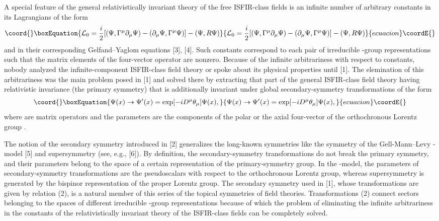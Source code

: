 \documentclass[a4paper,12pt]{article}
\begin{document}
A special feature of the general relativistically invariant theory of the free
ISFIR-class fields is an infinite number of arbitrary constants in its
Lagrangians of the form
\begin{equation}\coord{}\boxEquation{
{\cal L}_{0} = \frac{i}{2}[(\Psi, \Gamma^{\mu} \partial_{\mu} \Psi ) - 
(\partial_{\mu} \Psi, \Gamma^{\mu} \Psi )] - (\Psi, R\Psi )
}{
{\cal L}_{0} = \frac{i}{2}[(\Psi, \Gamma^{\mu} \partial_{\mu} \Psi ) - 
(\partial_{\mu} \Psi, \Gamma^{\mu} \Psi )] - (\Psi, R\Psi )
}{ecuacion}\coordE{}\end{equation}
and in their corresponding Gelfand--Yaglom equations [3], [4]. Such constants
correspond to each pair of irreducible \coordHE{}-group representations
such that the matrix elements of the four-vector operator \myHighlight{$\Gamma^{\mu}$}\coordHE{} are
nonzero. Because of the infinite arbitrariness with respect to constants,
nobody analyzed the infinite-component ISFIR-class field theory or spoke about
its physical properties until [1]. The elemination of this arbitrariness was 
the main problem posed in [1] and solved there by extracting that part of the
general ISFIR-class field theory having relativistic invariance (the primary
symmetry) that is additionally invariant under global secondary-symmetry
transformations of the form
\begin{equation}\coord{}\boxEquation{
\Psi (x) \rightarrow \Psi '(x) = \exp [-i D^{\mu} \theta_{\mu}] \Psi (x),
}{
\Psi (x) \rightarrow \Psi '(x) = \exp [-i D^{\mu} \theta_{\mu}] \Psi (x),
}{ecuacion}\coordE{}\end{equation}
where \coordHE{} are matrix operators and the parameters \myHighlight{$\theta_{\mu}$}\coordHE{} are the
components of the polar or the axial four-vector of the orthochronous Lorentz
group \coordHE{}.

The notion of the secondary symmetry introduced in [2] generalizes the
long-known symmetries like the symmetry of the Gell-Mann--Levy \myHighlight{$\sigma$}\coordHE{}-model
[5] and supersymmetry (see, e.g., [6]). By definition, the secondary-symmetry
transformations do not break the primary symmetry, and their parameters belong
to the space of a certain representation of the primary-symmetry group. In the
\myHighlight{$\sigma$}\coordHE{}-model, the parameters of secondary-symmetry transformations are the
pseudoscalars with respect to the orthochronous Lorentz group, whereas
supersymmetry is generated by the bispinor representation of the proper 
Lorentz group. The secondary symmetry used in [1], whose transformations are
given by relation (2), is a natural member of this series of the topical
symmetries of field theories. Transformations (2) connect sectors belonging to
the spaces of different irreducible \coordHE{}-group representations 
because of which the problem of eliminating the infinite arbitrariness in the
constants of the relativistically invariant theory of the ISFIR-class fields
can be completely solved.
\end{document}
